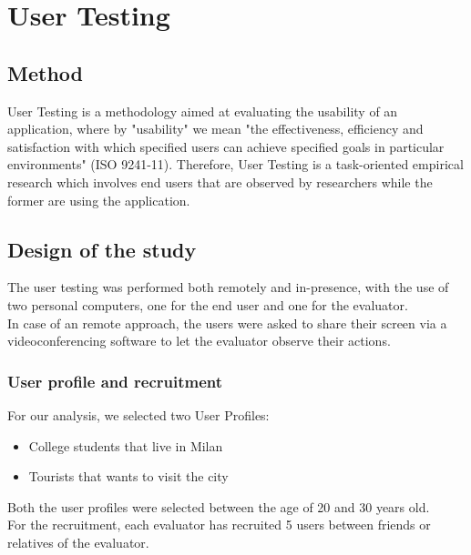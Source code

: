 
\section{User Testing}
\subsection{Method}

User Testing is a methodology aimed at evaluating the usability of an application, where by "usability" we mean "the effectiveness, efficiency and satisfaction with which specified users can achieve specified goals in particular environments" (ISO 9241-11). Therefore, User Testing is a task-oriented empirical research which involves end users that are observed by researchers while the former are using the application.

\subsection{Design of the study}
    The user testing was performed both remotely and in-presence, with the use of two personal computers, one for the end user and one for the evaluator.\\
    In case of an remote approach, the users were asked to share their screen via a videoconferencing software to let the evaluator observe their actions.

    \subsubsection{User profile and recruitment}
    For our analysis, we selected two User Profiles:

    \begin{itemize}
        \item College students that live in Milan 
        \item Tourists that wants to visit the city
    \end{itemize}

    Both the user profiles were selected between the age of 20 and 30 years old.\\
    For the recruitment, each evaluator has recruited 5 users between friends or relatives of the evaluator.

